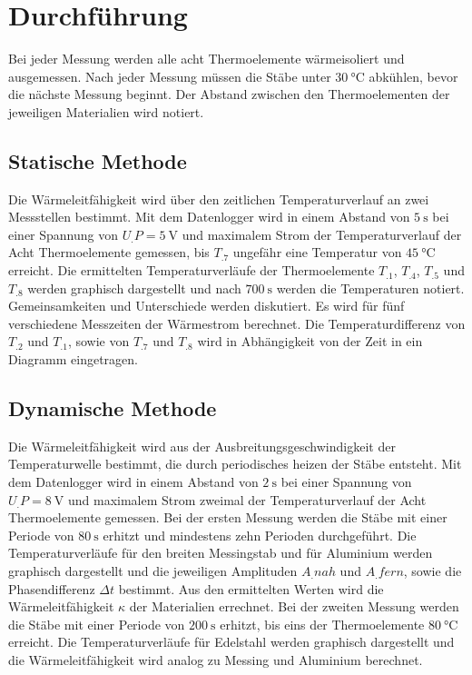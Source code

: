 
\section{Durchführung}
\label{sec:Durchführung}

Bei jeder Messung werden alle acht Thermoelemente wärmeisoliert und ausgemessen.
Nach jeder Messung müssen die Stäbe unter $\SI{30}{\celsius}$ abkühlen, bevor die nächste Messung beginnt. Der Abstand zwischen den Thermoelementen der jeweiligen Materialien wird notiert. 

\subsection{Statische Methode}

Die Wärmeleitfähigkeit wird über den zeitlichen Temperaturverlauf an zwei Messstellen bestimmt.
Mit dem Datenlogger wird in einem Abstand von $\SI{5}{\second}$ bei einer Spannung von $U_.P = \SI{5}{\volt}$ und maximalem Strom der Temperaturverlauf der Acht Thermoelemente gemessen, bis $T_.7$ ungefähr eine Temperatur von $\SI{45}{\celsius}$ erreicht.\newline
Die ermittelten Temperaturverläufe der Thermoelemente $T_.1$, $T_.4$, $T_.5$ und $T_.8$ werden graphisch dargestellt und nach $\SI{700}{\second}$ werden die Temperaturen notiert. Gemeinsamkeiten und Unterschiede werden diskutiert. 
Es wird für fünf verschiedene Messzeiten der Wärmestrom berechnet. 
Die Temperaturdifferenz von $T_.2$ und $T_.1$, sowie von $T_.7$ und $T_.8$ wird in Abhängigkeit von der Zeit in ein Diagramm eingetragen.
 
\subsection{Dynamische Methode}

Die Wärmeleitfähigkeit wird aus der Ausbreitungsgeschwindigkeit der Temperaturwelle bestimmt, die durch periodisches heizen der Stäbe entsteht.
Mit dem Datenlogger wird in einem Abstand von $\SI{2}{\second}$ bei einer Spannung von $U_.P = \SI{8}{\volt}$ und maximalem Strom zweimal der Temperaturverlauf der Acht Thermoelemente gemessen.\newline
Bei der ersten Messung werden die Stäbe mit einer Periode von $\SI{80}{\second}$ erhitzt und mindestens zehn Perioden durchgeführt.
Die Temperaturverläufe für den breiten Messingstab und für Aluminium werden graphisch dargestellt und die jeweiligen Amplituden $A_.{nah}$ und $A_.{fern}$, sowie die Phasendifferenz $\Delta t$ bestimmt. Aus den ermittelten Werten wird die Wärmeleitfähigkeit $\kappa$ der Materialien errechnet. \newline
Bei der zweiten Messung werden die Stäbe mit einer Periode von $\SI{200}{\second}$ erhitzt, bis eins der Thermoelemente $\SI{80}{\celsius}$ erreicht.
Die Temperaturverläufe für Edelstahl werden graphisch dargestellt und die Wärmeleitfähigkeit wird analog zu Messing und Aluminium berechnet.